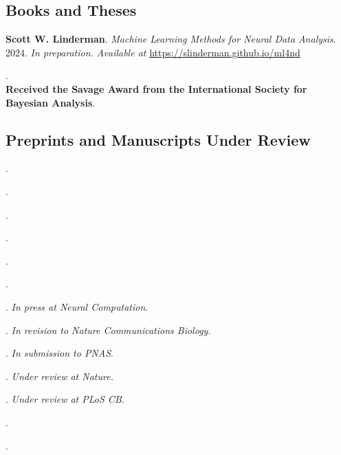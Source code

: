 \documentclass[10pt]{article}
\begin{document}
\subsection{Books and Theses}
\begin{pubslist}
\item \textbf{Scott W. Linderman}. \textit{Machine Learning Methods for Neural Data Analysis}. 2024. \textit{In preparation. Available at} \url{https://slinderman.github.io/ml4nd}
\item {}. \\
  \textbf{Received the Savage Award from the International Society for Bayesian Analysis}.
\end{pubslist}

\subsection{Preprints and Manuscripts Under Review}
\begin{pubslist}
\item {}.
\item {}.
\item {}.
\item {}.
\item {}.
\item {}.
\item {}. \textit{In press at Neural Computation}.
\item {}. \textit{In revision to Nature Communications Biology}.
\item {}. \textit{In submission to PNAS}.
\item {}. \textit{Under review at Nature.}
\item {}. \textit{Under review at PLoS CB.}
\item {}.
\item {}.
\end{pubslist}
\end{document}
